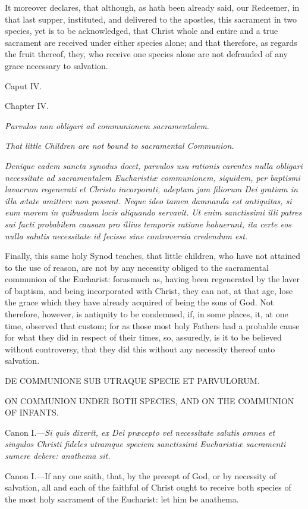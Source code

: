 It moreover declares, that although, as hath been already said, our Redeemer, in that last supper, instituted, and delivered to the apostles, this sacrament in two species, yet is to be acknowledged, that Christ whole and entire and a true sacrament are received under either species alone; and that therefore, as regards the fruit thereof, they, who receive one species alone are not defrauded of any grace necessary to salvation.

Caput IV.

Chapter IV.

\emph{Parvulos non obligari ad communionem sacramentalem.}

\emph{That little Children are not bound to sacramental Communion.}

\emph{Denique eadem sancta synodus docet, parvulos usu rationis carentes nulla obligari necessitate ad sacramentalem Eucharistiæ communionem, siquidem, per baptismi lavacrum regenerati et Christo incorporati, adeptam jam filiorum Dei gratiam in illa ætate amittere non possunt. Neque ideo tamen damnanda est antiquitas, si eum morem in quibusdam locis aliquando servavit. Ut enim sanctissimi illi patres sui facti probabilem causam pro illius temporis ratione habuerunt, ita certe eos nulla salutis necessitate id fecisse sine controversia credendum est.}

Finally, this same holy Synod teaches, that little children, who have not attained to the use of reason, are not by any necessity obliged to the sacramental communion of the Eucharist: forasmuch as, having been regenerated by the laver of baptism, and being incorporated with Christ, they can not, at that age, lose the grace which they have already acquired of being the sons of God. Not therefore, however, is antiquity to be condemned, if, in some places, it, at one time, observed that custom; for as those most holy Fathers had a probable cause for what they did in respect of their times, so, assuredly, is it to be believed without controversy, that they did this without any necessity thereof unto salvation.

DE COMMUNIONE SUB UTRAQUE SPECIE ET PARVULORUM.

ON COMMUNION UNDER BOTH SPECIES, AND ON THE COMMUNION OF INFANTS.

Canon I.—\emph{Si quis dixerit, ex Dei præcepto vel necessitate salutis omnes et singulos Christi fideles utramque speciem sanctissimi Eucharistiæ sacramenti sumere debere: anathema sit.}

Canon I.—If any one saith, that, by the precept of God, or by necessity of salvation, all and each of the faithful of Christ ought to receive both species of the most holy sacrament of the Eucharist: let him be anathema.

